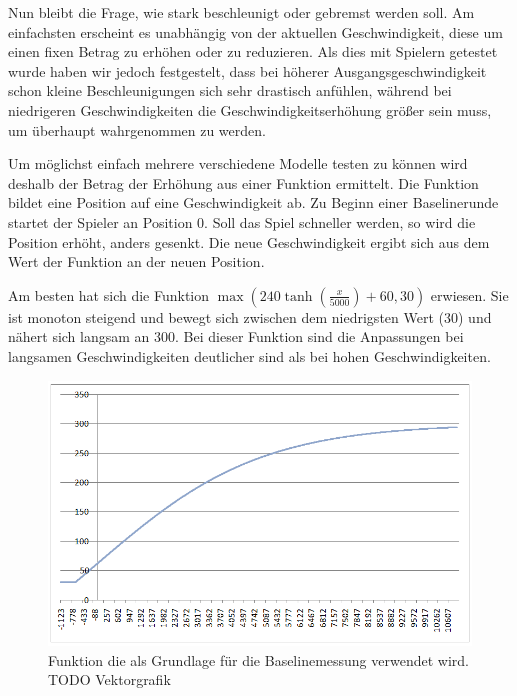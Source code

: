 \documentclass[a4paper,12pt]{scrartcl}
\begin{document}
Nun bleibt die Frage, wie stark beschleunigt oder gebremst werden soll. Am einfachsten
erscheint es unabhängig von der aktuellen Geschwindigkeit, diese um einen fixen Betrag
zu erhöhen oder zu reduzieren. Als dies mit Spielern getestet wurde haben wir jedoch
festgestelt, dass bei höherer Ausgangsgeschwindigkeit schon kleine Beschleunigungen
sich sehr drastisch anfühlen, während bei niedrigeren Geschwindigkeiten die
Geschwindigkeitserhöhung größer sein muss, um überhaupt wahrgenommen zu werden.

Um möglichst einfach mehrere verschiedene Modelle testen zu können wird deshalb der
Betrag der Erhöhung aus einer Funktion ermittelt. Die Funktion bildet eine Position auf
eine Geschwindigkeit ab. Zu Beginn einer Baselinerunde startet der Spieler an Position
0. Soll das Spiel schneller werden, so wird die Position erhöht, anders gesenkt. Die neue
Geschwindigkeit ergibt sich aus dem Wert der Funktion an der neuen Position.

Am besten hat sich die Funktion $\max(240 \tanh(\frac{x}{5000})+60,
30)$ erwiesen. Sie ist monoton steigend und bewegt sich zwischen dem niedrigsten
Wert (30) und nähert sich langsam an 300. Bei dieser Funktion sind die Anpassungen 
bei langsamen Geschwindigkeiten deutlicher sind als bei hohen Geschwindigkeiten.

\begin{figure}[htp]
\begin{center}
  \includegraphics[width=\textwidth]{BaselineFunktion.png}
  \caption{Funktion die als Grundlage für die Baselinemessung verwendet wird.\\
  TODO Vektorgrafik}
  \label{fig:BaselineFunktion}
\end{center}
\end{figure} 
\end{document}
